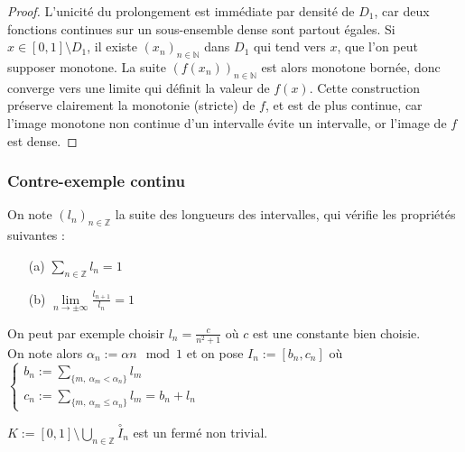 \documentclass[11pt,a4paper]{article}
\begin{document}
\begin{proof}
L'unicité du prolongement est immédiate par densité de $D_1$, car deux fonctions continues sur un sous-ensemble dense sont partout égales. Si $x\in [0,1]\setminus D_1$, il existe $(x_n)_{n\in \mathbb{N}}$ dans $D_1$ qui tend vers $x$, que l'on peut supposer monotone. La suite $(f(x_n))_{n\in\mathbb{N}}$ est alors monotone bornée, donc converge vers une limite qui définit la valeur de $f(x)$.
Cette construction préserve clairement la monotonie (stricte) de $f$, et est de plus continue, car l'image monotone non continue d'un intervalle évite un intervalle, or l'image de $f$ est dense. 
\end{proof} 

\subsubsection{Contre-exemple continu} 

On note $(l_n)_{n\in \mathbb{Z}}$ la suite des longueurs des intervalles,  qui vérifie les propriétés suivantes : 
\begin{enumerate}

\item[(a)] $\displaystyle \sum_{n\in \mathbb{Z}} l_n = 1$ 

\item[(b)]$\displaystyle \lim\limits_{n \to \pm \infty } \frac{l_{n+1}}{l_n} = 1 $

\end{enumerate} On peut par exemple choisir $l_n = \displaystyle \frac{c}{n^2 + 1}$ où $c$ est une constante bien choisie. \\
On note alors $ \alpha_n := \alpha n \mod 1$ et on pose $I_n := [b_n , c_n]$ où $\begin{cases} b_n := \displaystyle \sum_{\{m, \ \alpha_m < \alpha_n\}} l_m \\ c_n := \displaystyle \sum_{\{m, \ \alpha_m \leq \alpha_n\}} l_m  = b_n + l_n \end{cases}$ \\


\begin{lemma}\label{cantor}
$\displaystyle K := [0,1] \setminus \bigcup_{n\in \mathbb{Z}} \overset{\circ}I_n$ est un fermé non trivial.
\end{lemma}
\end{document}
